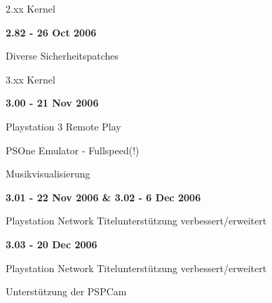 \documentclass[mode=print,paper=screen,style=jefka]{powerdot}
\begin{document}
\begin{slide}{2.xx Kernel}
	\begin{large}\textbf{2.82 - 26 Oct 2006}\end{large}
	\begin{list}{-}{}
		\item{Diverse Sicherheitspatches}
	\end{list}
\end{slide}

\begin{slide}{3.xx Kernel}
	\begin{large}\textbf{3.00 - 21 Nov 2006}\end{large}
	\begin{list}{-}{}
		\item{Playstation 3 Remote Play}
		\item{PSOne Emulator - Fullspeed(!)}
		\item{Musikvisualisierung}
	\end{list}
	\begin{large}\textbf{3.01 - 22 Nov 2006 \&  3.02 - 6 Dec 2006}\end{large}
	\begin{list}{-}{}
		\item{Playstation Network Titelunterstützung verbessert/erweitert}
	\end{list}
	\begin{large}\textbf{3.03 - 20 Dec 2006}\end{large}
	\begin{list}{-}{}
		\item{Playstation Network Titelunterstützung verbessert/erweitert}
		\item{Unterstützung der PSPCam}
	\end{list}
\end{slide}
\end{document}
